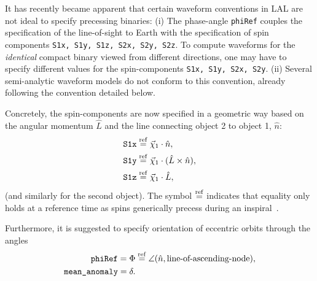 \documentclass[11pt,tightenlines,article,amssymb,amsmath,amsfonts,superscriptaddress,nofootinbib]{revtex4}
\newcommand{\nNR}{\hat{n}}
\newcommand{\lNR}{\hat L}
\newcommand{\phiRef}{\Phi} %
\newcommand{\equalref}{\overset{\rm ref}{=}}
\begin{document}
It has recently became apparent that certain waveform conventions in LAL
are not ideal to specify precessing binaries: (i) The
phase-angle {\tt phiRef} couples the specification of the line-of-sight to
Earth with the specification of spin components {\tt S1x, S1y, S1z, S2x,
S2y, S2z}. To compute waveforms for the \emph{identical} compact binary
viewed from different directions, one may have to specify different
values for the spin-components {\tt S1x, S1y, S2x, S2y}.
(ii) Several semi-analytic waveform models do not conform to this 
convention, already following the convention detailed below.

Concretely, the spin-components are now specified in a geometric
way based on the angular momentum $\lNR$ and the line connecting object 2 to
object 1, $\nNR$:
\begin{align}
  \mbox{\tt S1x}&\equalref \vec\chi_1\cdot\nNR,\\
  \mbox{\tt S1y}&\equalref \vec\chi_1\cdot (\lNR\times\nNR),\\
  \mbox{\tt S1z}&\equalref \vec\chi_1\cdot\lNR,
\end{align}
(and similarly for the second object). The symbol $\equalref$ indicates
that equality only holds at a reference time as spins generically
precess during an inspiral~\cite{Apostolatos:1994mx, Kidder:1995zr}.

Furthermore, it is suggested to specify
orientation of eccentric orbits through the angles
\begin{align}
  \mbox{\tt phiRef} = \phiRef &\equalref \angle(\nNR, \mbox{line-of-ascending-node}),\\
  \mbox{\tt mean\_anomaly}= \delta.& %
  \end{align}

\end{document}
